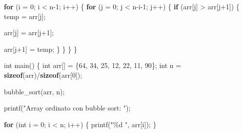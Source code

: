 \documentclass[
  letterpaper,
]{scrbook}
\newenvironment{Shaded}{\begin{snugshade}}{\end{snugshade}}
\newcommand{\ControlFlowTok}[1]{\textcolor[rgb]{0.00,0.23,0.31}{\textbf{#1}}}
\newcommand{\DataTypeTok}[1]{\textcolor[rgb]{0.68,0.00,0.00}{#1}}
\newcommand{\DecValTok}[1]{\textcolor[rgb]{0.68,0.00,0.00}{#1}}
\newcommand{\KeywordTok}[1]{\textcolor[rgb]{0.00,0.23,0.31}{\textbf{#1}}}
\newcommand{\NormalTok}[1]{\textcolor[rgb]{0.00,0.23,0.31}{#1}}
\newcommand{\OperatorTok}[1]{\textcolor[rgb]{0.37,0.37,0.37}{#1}}
\newcommand{\SpecialCharTok}[1]{\textcolor[rgb]{0.37,0.37,0.37}{#1}}
\newcommand{\StringTok}[1]{\textcolor[rgb]{0.13,0.47,0.30}{#1}}
\begin{document}
\begin{itemize}
\begin{Shaded}
\begin{Highlighting}[]
  \ControlFlowTok{for} \OperatorTok{(}\NormalTok{i }\OperatorTok{=} \DecValTok{0}\OperatorTok{;}\NormalTok{ i }\OperatorTok{\textless{}}\NormalTok{ n}\OperatorTok{{-}}\DecValTok{1}\OperatorTok{;}\NormalTok{ i}\OperatorTok{++)} \OperatorTok{\{}
    \ControlFlowTok{for} \OperatorTok{(}\NormalTok{j }\OperatorTok{=} \DecValTok{0}\OperatorTok{;}\NormalTok{ j }\OperatorTok{\textless{}}\NormalTok{ n}\OperatorTok{{-}}\NormalTok{i}\OperatorTok{{-}}\DecValTok{1}\OperatorTok{;}\NormalTok{ j}\OperatorTok{++)} \OperatorTok{\{}
      \ControlFlowTok{if} \OperatorTok{(}\NormalTok{arr}\OperatorTok{[}\NormalTok{j}\OperatorTok{]} \OperatorTok{\textgreater{}}\NormalTok{ arr}\OperatorTok{[}\NormalTok{j}\OperatorTok{+}\DecValTok{1}\OperatorTok{])} \OperatorTok{\{}
\NormalTok{        temp }\OperatorTok{=}\NormalTok{ arr}\OperatorTok{[}\NormalTok{j}\OperatorTok{];}

\NormalTok{        arr}\OperatorTok{[}\NormalTok{j}\OperatorTok{]} \OperatorTok{=}\NormalTok{ arr}\OperatorTok{[}\NormalTok{j}\OperatorTok{+}\DecValTok{1}\OperatorTok{];}

\NormalTok{        arr}\OperatorTok{[}\NormalTok{j}\OperatorTok{+}\DecValTok{1}\OperatorTok{]} \OperatorTok{=}\NormalTok{ temp}\OperatorTok{;}
      \OperatorTok{\}}
    \OperatorTok{\}}
  \OperatorTok{\}}
\OperatorTok{\}}

\DataTypeTok{int}\NormalTok{ main}\OperatorTok{()} \OperatorTok{\{}
  \DataTypeTok{int}\NormalTok{ arr}\OperatorTok{[]} \OperatorTok{=} \OperatorTok{\{}\DecValTok{64}\OperatorTok{,} \DecValTok{34}\OperatorTok{,} \DecValTok{25}\OperatorTok{,} \DecValTok{12}\OperatorTok{,} \DecValTok{22}\OperatorTok{,} \DecValTok{11}\OperatorTok{,} \DecValTok{90}\OperatorTok{\};}
  \DataTypeTok{int}\NormalTok{ n }\OperatorTok{=} \KeywordTok{sizeof}\OperatorTok{(}\NormalTok{arr}\OperatorTok{)/}\KeywordTok{sizeof}\OperatorTok{(}\NormalTok{arr}\OperatorTok{[}\DecValTok{0}\OperatorTok{]);}

\NormalTok{  bubble\_sort}\OperatorTok{(}\NormalTok{arr}\OperatorTok{,}\NormalTok{ n}\OperatorTok{);}

\NormalTok{  printf}\OperatorTok{(}\StringTok{"Array ordinato con bubble sort: "}\OperatorTok{);}

  \ControlFlowTok{for} \OperatorTok{(}\DataTypeTok{int}\NormalTok{ i }\OperatorTok{=} \DecValTok{0}\OperatorTok{;}\NormalTok{ i }\OperatorTok{\textless{}}\NormalTok{ n}\OperatorTok{;}\NormalTok{ i}\OperatorTok{++)} \OperatorTok{\{}
\NormalTok{    printf}\OperatorTok{(}\StringTok{"}\SpecialCharTok{\%d}\StringTok{ "}\OperatorTok{,}\NormalTok{ arr}\OperatorTok{[}\NormalTok{i}\OperatorTok{]);}
  \OperatorTok{\}}


\end{Highlighting}
\end{Shaded}
\end{itemize}
\end{document}
